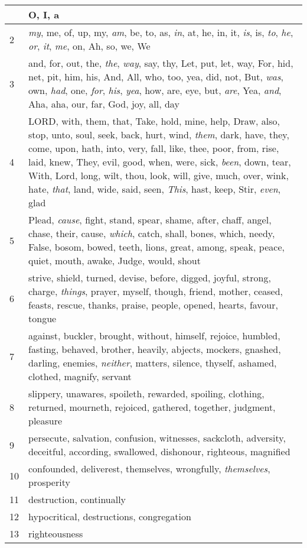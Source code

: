 \begin{longtable}{l|p{3.75in}}
\hline \hline
\endlastfoot
1 & O, I, a \\ \hline
2 & \emph{my}, me, of, up, my, \emph{am}, be, to, as, \emph{in}, at, he, in, it, \emph{is}, is, \emph{to}, \emph{he}, \emph{or}, \emph{it}, \emph{me}, on, Ah, so, we, We \\ \hline
3 & and, for, out, the, \emph{the}, \emph{way}, say, thy, Let, put, let, way, For, hid, net, pit, him, his, And, All, who, too, yea, did, not, But, \emph{was}, own, \emph{had}, one, \emph{for}, \emph{his}, \emph{yea}, how, are, eye, but, \emph{are}, Yea, \emph{and}, Aha, aha, our, far, God, joy, all, day \\ \hline
4 & LORD, with, them, that, Take, hold, mine, help, Draw, also, stop, unto, soul, seek, back, hurt, wind, \emph{them}, dark, have, they, come, upon, hath, into, very, fall, like, thee, poor, from, rise, laid, knew, They, evil, good, when, were, sick, \emph{been}, down, tear, With, Lord, long, wilt, thou, look, will, give, much, over, wink, hate, \emph{that}, land, wide, said, seen, \emph{This}, hast, keep, Stir, \emph{even}, glad \\ \hline
5 & Plead, \emph{cause}, fight, stand, spear, shame, after, chaff, angel, chase, their, cause, \emph{which}, catch, shall, bones, which, needy, False, bosom, bowed, teeth, lions, great, among, speak, peace, quiet, mouth, awake, Judge, would, shout \\ \hline
6 & strive, shield, turned, devise, before, digged, joyful, strong, charge, \emph{things}, prayer, myself, though, friend, mother, ceased, feasts, rescue, thanks, praise, people, opened, hearts, favour, tongue \\ \hline
7 & against, buckler, brought, without, himself, rejoice, humbled, fasting, behaved, brother, heavily, abjects, mockers, gnashed, darling, enemies, \emph{neither}, matters, silence, thyself, ashamed, clothed, magnify, servant \\ \hline
8 & slippery, unawares, spoileth, rewarded, spoiling, clothing, returned, mourneth, rejoiced, gathered, together, judgment, pleasure \\ \hline
9 & persecute, salvation, confusion, witnesses, sackcloth, adversity, deceitful, according, swallowed, dishonour, righteous, magnified \\ \hline
10 & confounded, deliverest, themselves, wrongfully, \emph{themselves}, prosperity \\ \hline
11 & destruction, continually \\ \hline
12 & hypocritical, destructions, congregation \\ \hline
13 & righteousness \\ \hline
\end{longtable}






